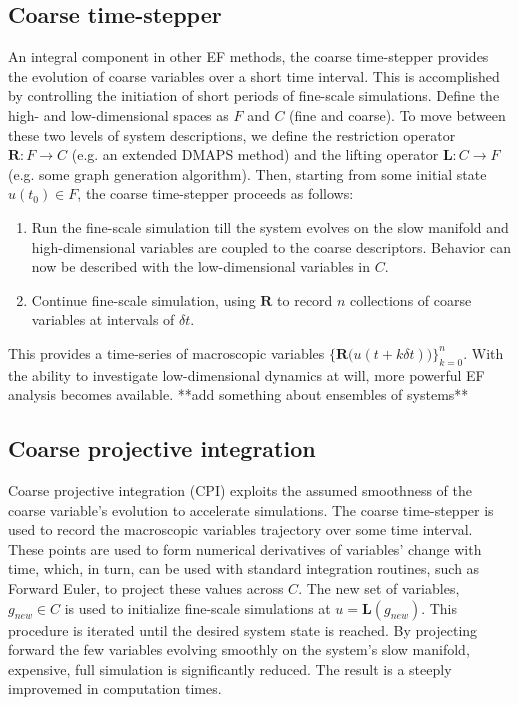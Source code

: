 \documentclass[11pt]{article}
\begin{document}
\subsection{Coarse time-stepper}
\indent An integral component in other EF methods, the coarse time-stepper provides the evolution of coarse variables over a short time interval. This is accomplished by controlling the initiation of short periods of fine-scale simulations. Define the high- and low-dimensional spaces as $F$ and $C$ (fine and coarse). To move between these two levels of system descriptions, we define the restriction operator $\textbf{R}: F \rightarrow C$ (e.g. an extended DMAPS method) and the lifting operator $\textbf{L}: C \rightarrow F$ (e.g. some graph generation algorithm). Then, starting from some initial state $u(t_{0}) \in F$, the coarse time-stepper proceeds as follows:
\begin{enumerate}
\item Run the fine-scale simulation till the system evolves on the slow manifold and high-dimensional variables are coupled to the coarse descriptors. Behavior can now be described with the low-dimensional variables in $C$.
\item Continue fine-scale simulation, using $\textbf{R}$ to record $n$ collections of coarse variables at intervals of $\delta t$. 
\end{enumerate}
This provides a time-series of macroscopic variables $\{ \textbf{R(}u(t+k\delta t) \textbf{)} \}_{k=0}^{n}$. With the ability to investigate low-dimensional dynamics at will, more powerful EF analysis becomes available. **add something about ensembles of systems**
\subsection{Coarse projective integration}
\indent Coarse projective integration (CPI) exploits the assumed smoothness of the coarse variable's evolution to accelerate simulations. The coarse time-stepper is used to record the macroscopic variables trajectory over some time interval. These points are used to form numerical derivatives of variables' change with time, which, in turn, can be used with standard integration routines, such as Forward Euler, to project these values across $C$. The new set of variables, $g_{new} \in C$ is used to initialize fine-scale simulations at $u = \textbf{L}(g_{new})$. This procedure is iterated until the desired system state is reached. By projecting forward the few variables evolving smoothly on the system's slow manifold, expensive, full simulation is significantly reduced. The result is a steeply improvemed in computation times.
\end{document}
